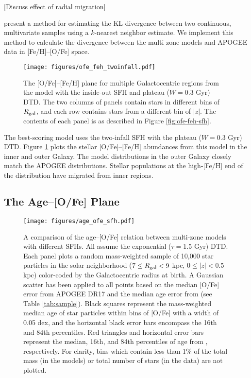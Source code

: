 \documentclass[twocolumn,twocolappendix,linenumbers,trackchanges]{aastex631}
\begin{document}
[Discuss effect of radial migration]

\citet{PerezCruz2008-KLTest2D} present a method for estimating the KL divergence between two continuous, multivariate samples using a $k$-nearest neighbor estimate. We implement this method to calculate the divergence between the multi-zone models and APOGEE data in [Fe/H]--[O/Fe] space.

\begin{figure}
    \centering
    \texttt{[image: figures/ofe\_feh\_twoinfall.pdf]}
    \caption{The [O/Fe]--[Fe/H] plane for multiple Galactocentric regions from the model with the inside-out SFH and plateau ($W=0.3$ Gyr) DTD. The two columns of panels contain stars in different bins of $R_{\rm gal}$, and each row contains stars from a different bin of $|z|$. The contents of each panel is as described in Figure \ref{fig:ofe-feh-sfh}.}
    \label{fig:ofe-feh-twoinfall}
\end{figure}

The best-scoring model uses the two-infall SFH with the plateau ($W=0.3$ Gyr) DTD. Figure \ref{fig:ofe-feh-twoinfall} plots the stellar [O/Fe]--[Fe/H] abundances from this model in the inner and outer Galaxy. The model distributions in the outer Galaxy closely match the APOGEE distributions. Stellar populations at the high-[Fe/H] end of the distribution have migrated from inner regions.

\subsection{The Age--[O/Fe] Plane}
\label{sec:age-ofe}

\begin{figure}
    \centering
    \texttt{[image: figures/age\_ofe\_sfh.pdf]}
    \caption{A comparison of the age--[O/Fe] relation between multi-zone models with different SFHs. All assume the exponential ($\tau=1.5$ Gyr) DTD. Each panel plots a random mass-weighted sample of 10,000 star particles in the solar neighborhood ($7\leq R_{\rm gal}<9$ kpc, $0\leq|z|<0.5$ kpc) color-coded by the Galactocentric radius at birth. A Gaussian scatter has been applied to all points based on the median [O/Fe] error from APOGEE DR17 and the median age error from  (see Table \ref{tab:sample}). Black squares represent the mass-weighted median age of star particles within bins of [O/Fe] with a width of 0.05 dex, and the horizontal black error bars encompass the 16th and 84th percentiles. Red triangles and horizontal error bars represent the median, 16th, and 84th percentiles of age from , respectively. For clarity, bins which contain less than 1\% of the total mass (in the models) or total number of stars (in the data) are not plotted.}
    \label{fig:age-ofe-sfh}
\end{figure}
\end{document}
